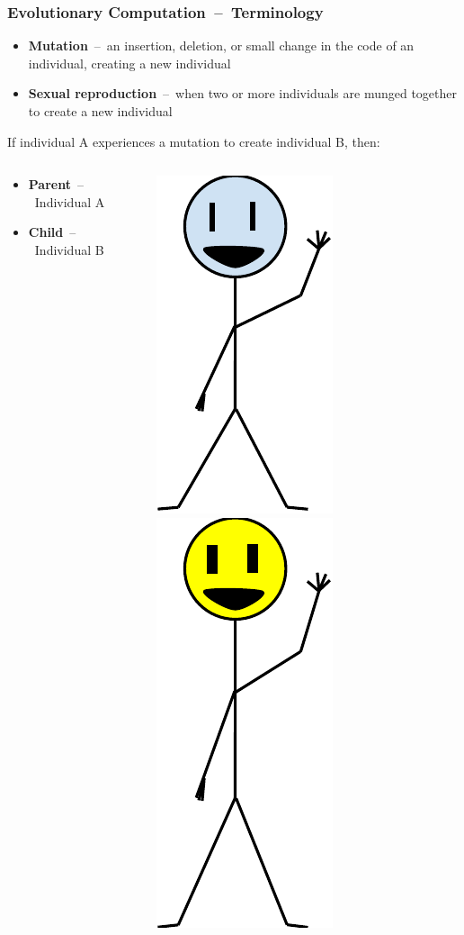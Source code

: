 \documentclass{beamer}
\newcommand{\linespace}{\vskip 0.25cm}
\begin{document}
\begin{frame}
	\frametitle{Evolutionary Computation~--~Terminology}
	\begin{itemize}
		\item \textbf{Mutation}~--~an insertion, deletion, or small change in the code of an individual, creating a new individual
		\linespace
		\item \textbf{Sexual reproduction}~--~when two or more individuals are munged together to create a new individual
		\linespace
		\pause
	\end{itemize}
		If individual A experiences a mutation to create individual B, then:
	\begin{columns}
		\begin{column}{.6\textwidth}
			\begin{itemize}
				\item \textbf{Parent}~--~Individual A
				\linespace
				\linespace
				\linespace
				\linespace
				\item \textbf{Child}~--~Individual B
			\end{itemize}
		\end{column}
		\begin{column}{.4\textwidth}
			\pause[2]
			\includegraphics[height=.4\textwidth]{Illustrations/individual.PDF}
			\linespace
			\pause[2]
			\includegraphics[height=.5\textwidth]{Illustrations/child.PDF}
		\end{column}
	\end{columns}
\end{frame}
\end{document}
